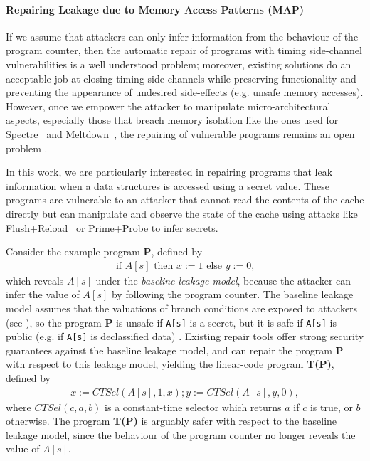 \paragraph*{Repairing Leakage due to Memory Access Patterns (MAP)} 
If we assume that attackers can only infer information from the behaviour of the program counter, then the automatic repair of programs with timing side-channel vulnerabilities is a well understood problem; moreover, existing solutions \cite{SCEliminator,MSESC,Racoon} do an acceptable job at closing timing side-channels while preserving functionality and preventing the appearance of undesired side-effects (e.g. unsafe memory accesses). %
However, once we empower the attacker to manipulate micro-architectural aspects, especially those that breach memory isolation like the ones used for Spectre~\cite{Spectre} and Meltdown~\cite{Meltdown}, the repairing of vulnerable programs remains an open problem \cite{timing-channel-survey}. 

In this work, we are particularly interested in repairing programs that leak information when a data structures is accessed using a secret value. These programs are vulnerable to an attacker that cannot read the contents of the cache directly but can manipulate and observe the state of the cache using attacks like Flush+Reload~\cite{Flush+Reload} or Prime+Probe\cite{prime-probe} to infer secrets.

Consider the example program \textbf{P}, defined by%
    \begin{align*}
        \text{if $A[s]$ then $x:=1$ else $y:=0$,}
    \end{align*}
which reveals $A[s]$ under the \emph{baseline leakage model}, because the attacker can infer the value of $A[s]$ by following the program counter. The baseline leakage model assumes that the valuations of branch conditions are exposed to attackers (see \cite[\S3, Example 1]{usenix_ctp_verification}), so the program \textbf{P} is unsafe if \texttt{A[s]} is a secret, but it is safe if \texttt{A[s]} is public (e.g. if \texttt{A[s]} is declassified data)%
. Existing repair tools \cite{SCEliminator,MSESC,Racoon} offer strong security guarantees against the baseline leakage model, and can repair the program \textbf{P} with respect to this leakage model, yielding the linear-code program \textbf{T(P)}, defined by
\begin{align*}
    x:=CTSel(A[s],1,x);y:=CTSel(A[s],y,0),
\end{align*}
where $CTSel(c,a,b)$ is a constant-time selector which returns $a$ if $c$ is true, or $b$ otherwise. The program \textbf{T(P)} is arguably safer with respect to the baseline leakage model, since the behaviour of the program counter no longer reveals the value of $A[s]$. 

